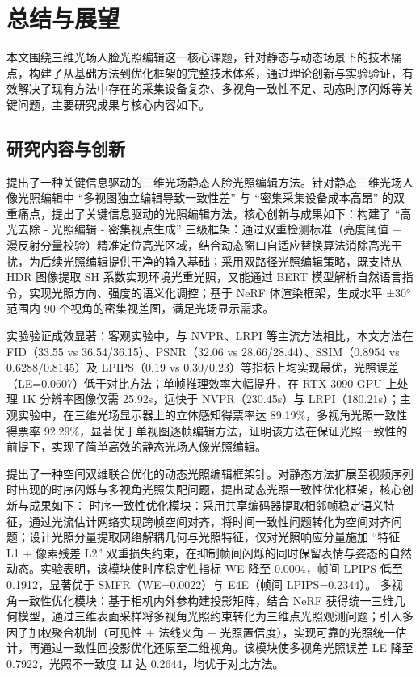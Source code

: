 \chapter{总结与展望}
本文围绕三维光场人脸光照编辑这一核心课题，针对静态与动态场景下的技术痛点，构建了从基础方法到优化框架的完整技术体系，通过理论创新与实验验证，有效解决了现有方法中存在的采集设备复杂、多视角一致性不足、动态时序闪烁等关键问题，主要研究成果与核心内容如下。
\section{研究内容与创新}
提出了一种关键信息驱动的三维光场静态人脸光照编辑方法。针对静态三维光场人像光照编辑中 “多视图独立编辑导致一致性差” 与 “密集采集设备成本高昂” 的双重痛点，提出了关键信息驱动的光照编辑方法，核心创新与成果如下：构建了 “高光去除 - 光照编辑 - 密集视点生成” 三级框架：通过双重检测标准（亮度阈值 + 漫反射分量校验）精准定位高光区域，结合动态窗口自适应替换算法消除高光干扰，为后续光照编辑提供干净的输入基础；采用双路径光照编辑策略，既支持从 HDR 图像提取 SH 系数实现环境光重光照，又能通过 BERT 模型解析自然语言指令，实现光照方向、强度的语义化调控；基于 NeRF 体渲染框架，生成水平 ±30° 范围内 90 个视角的密集视差图，满足光场显示需求。

实验验证成效显著：客观实验中，与 NVPR、LRPI 等主流方法相比，本文方法在 FID（33.55 vs 36.54/36.15）、PSNR（32.06 vs 28.66/28.44）、SSIM（0.8954 vs 0.6288/0.8145）及 LPIPS（0.19 vs 0.30/0.23）等指标上均实现最优，光照误差（LE=0.0607）低于对比方法；单帧推理效率大幅提升，在 RTX 3090 GPU 上处理 1K 分辨率图像仅需 25.92s，远快于 NVPR（230.45s）与 LRPI（180.21s）；主观实验中，在三维光场显示器上的立体感知得票率达 89.19\%，多视角光照一致性得票率 92.29\%，显著优于单视图逐帧编辑方法，证明该方法在保证光照一致性的前提下，实现了简单高效的静态光场人像光照编辑。


提出了一种空间双维联合优化的动态光照编辑框架针。对静态方法扩展至视频序列时出现的时序闪烁与多视角光照失配问题，提出动态光照一致性优化框架，核心创新与成果如下：
时序一致性优化模块：采用共享编码器提取相邻帧稳定语义特征，通过光流估计网络实现跨帧空间对齐，将时间一致性问题转化为空间对齐问题；设计光照分量提取网络解耦几何与光照特征，仅对光照响应分量施加 “特征 L1 + 像素残差 L2” 双重损失约束，在抑制帧间闪烁的同时保留表情与姿态的自然动态。实验表明，该模块使时序稳定性指标 WE 降至 0.0004，帧间 LPIPS 低至 0.1912，显著优于 SMFR（WE=0.0022）与 E4E（帧间 LPIPS=0.2344）。
多视角一致性优化模块：基于相机内外参构建投影矩阵，结合 NeRF 获得统一三维几何模型，通过三维表面采样将多视角光照约束转化为三维点光照观测问题；引入多因子加权聚合机制（可见性 + 法线夹角 + 光照置信度），实现可靠的光照统一估计，再通过一致性回投影优化还原至二维视角。该模块使多视角光照误差 LE 降至 0.7922，光照不一致度 LI 达 0.2644，均优于对比方法。

